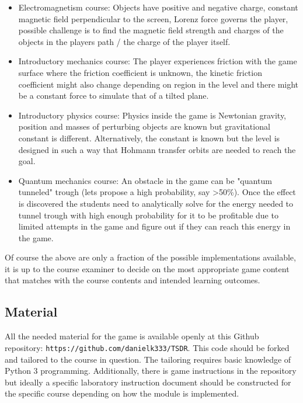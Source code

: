 \documentclass[11pt, twocolumn]{article}
\begin{document}
\begin{itemize}
    \item Electromagnetism course:\newline
    Objects have positive and negative charge, constant magnetic field perpendicular to the screen, Lorenz force governs the player, possible challenge is to find the magnetic field strength and charges of the objects in the players path / the charge of the player itself.
    \item Introductory mechanics course:\newline
    The player experiences friction with the game surface where the friction coefficient is unknown, the kinetic friction coefficient might also change depending on region in the level and there might be a constant force to simulate that of a tilted plane.
    \item Introductory physics course:\newline
    Physics inside the game is Newtonian gravity, position and masses of perturbing objects are known but gravitational constant is different. Alternatively, the constant is known but the level is designed in such a way that Hohmann transfer orbits are needed to reach the goal.
    \item Quantum mechanics course:\newline
    An obstacle in the game can be "quantum tunneled" trough (lets propose a high probability, say >50\%). Once the effect is discovered the students need to analytically solve for the energy needed to tunnel trough with high enough probability for it to be profitable due to limited attempts in the game and figure out if they can reach this energy in the game.
\end{itemize}

Of course the above are only a fraction of the possible implementations available, it is up to the course examiner to decide on the most appropriate game content that matches with the course contents and intended learning outcomes.

\subsection{Material}

All the needed material for the game is available openly at this Github repository: \texttt{https://github.com/danielk333/TSDR}. This code should be forked and tailored to the course in question. The tailoring requires basic knowledge of Python 3 programming. Additionally, there is game instructions in the repository but ideally a specific laboratory instruction document should be constructed for the specific course depending on how the module is implemented.
\end{document}
